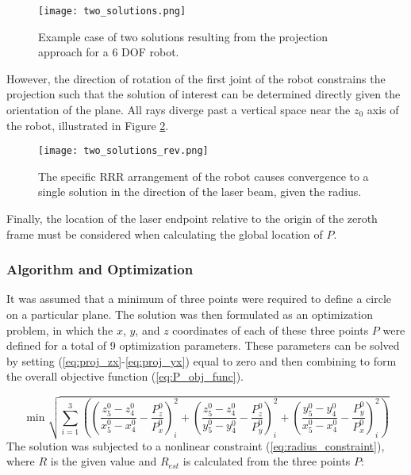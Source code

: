 \documentclass[12pt]{article}
\begin{document}
\begin{figure}[!ht]
  {\texttt{[image: two\_solutions.png]}}
  \centering
  \caption{Example case of two solutions resulting from the projection approach for a 6 DOF robot.} 
  \centering
  \label{fig:two_solutions}
\end{figure}

However, the direction of rotation of the first joint of the robot constrains the projection such that the solution of interest can be determined directly given the orientation of the plane. All rays diverge past a vertical space near the $z_0$ axis of the robot, illustrated in Figure \ref{fig:two_solutions_rev}.

\begin{figure}[!ht]
  {\texttt{[image: two\_solutions\_rev.png]}}
  \centering
  \caption{The specific RRR arrangement of the robot causes convergence to a single solution in the direction of the laser beam, given the radius.} 
  \centering
  \label{fig:two_solutions_rev}
\end{figure}

Finally, the location of the laser endpoint relative to the origin of the zeroth frame must be considered when calculating the global location of $P$.

\subsubsection{Algorithm and Optimization}

It was assumed that a minimum of three points were required to define a circle on a particular plane. The solution was then formulated as an optimization problem, in which the $x$, $y$, and $z$ coordinates of each of these three points $P$ were defined for a total of 9 optimization parameters.  These parameters can be solved by setting (\ref{eq:proj_zx}-\ref{eq:proj_yx}) equal to zero and then combining to form the overall objective function (\ref{eq:P_obj_func}).  


\begin{equation}
	\min \sqrt{\sum\limits_{i=1}^3\left(\left(\dfrac{z_5^0-z_4^0}{x_5^0-x_4^0} - \dfrac{P_z^0}{P_x^0}\right)_i^2 + \left(\dfrac{z_5^0-z_4^0}{y_5^0-y_4^0} - \dfrac{P_z^0}{P_y^0}\right)_i^2 + \left(\dfrac{y_5^0-y_4^0}{x_5^0-x_4^0} - \dfrac{P_y^0}{P_x^0}\right)_i^2\right)}
    \label{eq:P_obj_func}
\end{equation}
\noindent
The solution was subjected to a nonlinear constraint (\ref{eq:radius_constraint}), where $R$ is the given value and $R_{est}$ is calculated from the three points $P$: 
\end{document}
